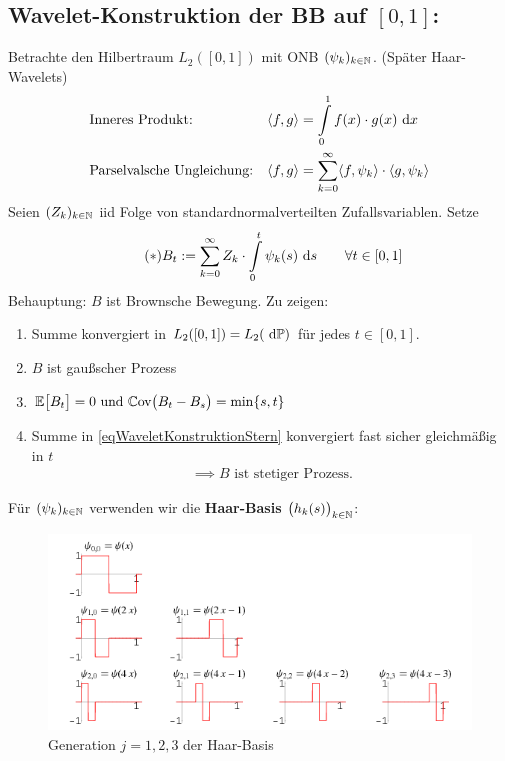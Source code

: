 \subsection*{\textbf{Wavelet-Konstruktion} der BB auf $[0,1]$:}
Betrachte den Hilbertraum $L_2([0,1])$ mit ONB $(\psi_k)_{k\in\mathbb{N}}$. (Später Haar-Wavelets)
\begin{align*}
	&\text{Inneres Produkt:} &\langle f,g\rangle&=\int\limits_0^1 f(x)\cdot g(x)\text{ d} x\\
	&\text{Parselvalsche Ungleichung:} &\langle f,g\rangle&=\sum\limits_{k=0}^\infty\langle f,\psi_k\rangle\cdot\langle g,\psi_k\rangle
\end{align*}
Seien $(Z_k)_{k\in\mathbb{N}}$ iid Folge von standardnormalverteilten Zufallsvariablen. Setze
\begin{align}\label{eqWaveletKonstruktionStern}\tag{$\ast$}
	B_t:=\sum\limits_{k=0}^\infty Z_k\cdot\int\limits_0^t\psi_k(s)\text{ d} s\qquad\forall t\in[0,1]
\end{align}
Behauptung: $B$ ist Brownsche Bewegung.\nl
Zu zeigen:
\begin{enumerate}[label=\alph*)]
	\item Summe konvergiert in $L_2([0,1])=L_2(\text{ d}\mathbb{P})$ für jedes $t\in[0,1]$.
	\item $B$ ist gaußscher Prozess
	\item $\begin{aligned}
		\mathbb{E}\big[B_t\big]=0\text{ und }\mathbb{C}\text{ov}\big(B_t-B_s\big)=\min\lbrace s,t\rbrace
	\end{aligned}$
	\item Summe in \eqref{eqWaveletKonstruktionStern} konvergiert fast sicher gleichmäßig in $t$
	\begin{align*}
		\implies B\text{ ist stetiger Prozess.}
	\end{align*}
\end{enumerate}

Für $(\psi_k)_{k\in\mathbb{N}}$ verwenden wir die \textbf{Haar-Basis} $\big(h_k(s)\big)_{k\in\mathbb{N}}$:

\begin{figure}[H]
	\begin{center}
		\includegraphics[width=1\textwidth]{./pics/Haar.png}
		\caption{Generation $j=1,2,3$ der Haar-Basis}
		\label{AbbHaarBasis}
	\end{center}
\end{figure}


